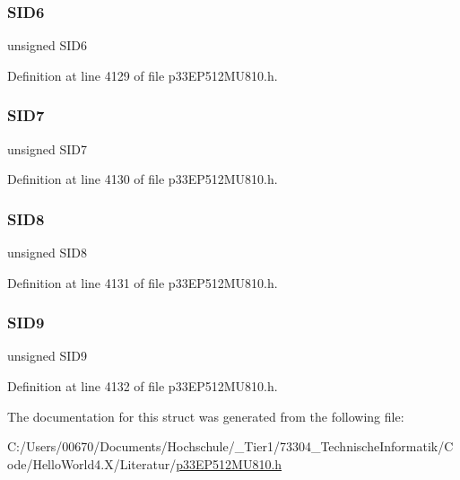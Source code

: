 \subsubsection{\texorpdfstring{S\+I\+D6}{SID6}}
{\footnotesize\ttfamily unsigned S\+I\+D6}



Definition at line 4129 of file p33\+E\+P512\+M\+U810.\+h.

\mbox{\label{structtag_c1_r_x_f7_s_i_d_b_i_t_s_a34097fb76decd431701fa2d86a22328e}} 
\subsubsection{\texorpdfstring{S\+I\+D7}{SID7}}
{\footnotesize\ttfamily unsigned S\+I\+D7}



Definition at line 4130 of file p33\+E\+P512\+M\+U810.\+h.

\mbox{\label{structtag_c1_r_x_f7_s_i_d_b_i_t_s_afe74894633244fdb0b0c01b4e8c522e7}} 
\subsubsection{\texorpdfstring{S\+I\+D8}{SID8}}
{\footnotesize\ttfamily unsigned S\+I\+D8}



Definition at line 4131 of file p33\+E\+P512\+M\+U810.\+h.

\mbox{\label{structtag_c1_r_x_f7_s_i_d_b_i_t_s_a33587704948067005c2a6a3ccc503c99}} 
\subsubsection{\texorpdfstring{S\+I\+D9}{SID9}}
{\footnotesize\ttfamily unsigned S\+I\+D9}



Definition at line 4132 of file p33\+E\+P512\+M\+U810.\+h.



The documentation for this struct was generated from the following file\+:\begin{DoxyCompactItemize}
\item 
C\+:/\+Users/00670/\+Documents/\+Hochschule/\+\_\+\+Tier1/73304\+\_\+\+Technische\+Informatik/\+Code/\+Hello\+World4.\+X/\+Literatur/\hyperlink{p33_e_p512_m_u810_8h}{p33\+E\+P512\+M\+U810.\+h}\end{DoxyCompactItemize}
